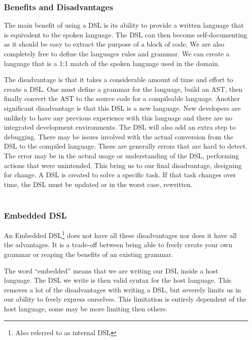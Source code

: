 \subsubsection{Benefits and Disadvantages}
The main benefit of using a DSL is its ability to provide a written language that is equivalent to the spoken language. The DSL can then become self-documenting as it should be easy to extract the purpose of a block of code. We are also completely free to define the languages rules and grammar. We can create a language that is a 1:1 match of the spoken language used in the domain.

The disadvantage is that it takes a considerable amount of time and effort to create a DSL. One must define a grammar for the language, build an AST, then finally convert the AST to the source code for a compileable language. Another significant disadvantage is that this DSL is a new language. New developers are unlikely to have any previous experience with this language and there are no integrated development environments. The DSL will also add an extra step to debugging. There may be issues involved with the actual conversion from the DSL to the compiled language. These are generally errors that are hard to detect. The error may be in the actual usage or understanding of the DSL, performing actions that were unintended. This bring us to our final disadvantage, designing for change. A DSL is created to solve a specific task. If that task changes over time, the DSL must be updated or in the worst case, rewritten. 
\\\\
\subsubsection{Embedded DSL}
An Embedded DSL\footnote{Also referred to as internal DSL} does not have all these disadvantages nor does it have all the advantages. It is a trade-off between being able to freely create your own grammar or reaping the benefits of an existing grammar.

The word ``embedded'' means that we are writing our DSL inside a host language. The DSL we write is then valid syntax for the host language. This removes a lot of the disadvantages with writing a DSL, but severely limits us in our ability to freely express ourselves. This limitation is entirely dependent of the host language, some may be more limiting then others.

